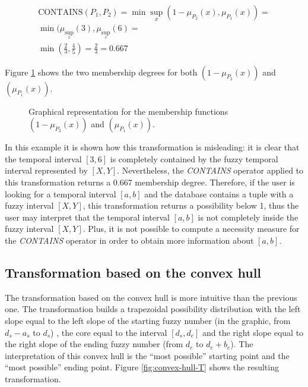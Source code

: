 \documentclass[twoside,twocolumn,a4paper]{article}
\begin{document}
\begin{eqnarray}
\nonumber
\mbox{CONTAINS}\left(P_1,P_2 \right) = \min \sup_{x} \left(1-\mu_{P_2}(x),\mu_{P_1}(x) \right) = \\
\nonumber
 \min (\mu_{\sup_x}(3),\mu_{\sup_x}(6) = \\
\nonumber
\min (\frac{2}{3},\frac{4}{5}) = \frac{2}{3} = 0.667
\end{eqnarray}

Figure \ref{fig:example_pi} shows the two membership degrees for both $\left(1-\mu_{P_2}(x)\right)$ and $\left( \mu_{P_1}(x) \right)$.

\begin{figure}[h!]
  \centering
  
  \caption{Graphical representation for the membership functions $\left(1-\mu_{P_2}(x)\right)$ and $\left( \mu_{P_1}(x) \right) $.}
  \label{fig:example_pi}
\end{figure}

In this example it is shown how this transformation is misleading: it is clear that the temporal interval $[3,6]$ is completely contained by the fuzzy temporal interval represented by $[X,Y]$. Nevertheless, the \emph{CONTAINS} operator applied to this transformation returns a 0.667 membership degree. Therefore, if the user is looking for a temporal interval $[a,b]$ and the database contains a tuple with a fuzzy interval $[X,Y]$, this transformation returns a possibility below 1, thus the user may interpret that the temporal interval $[a,b]$ is not completely inside the fuzzy interval $[X,Y]$. Plus, it is not possible to compute a necessity measure for the \emph{CONTAINS} operator in order to obtain more information about $[a,b]$.





\subsection{\label{subsubsec:trans-convex-hull}Transformation based on the convex hull}
The transformation based on the convex hull is more intuitive than the previous one. The transformation builds a trapezoidal possibility distribution with the left slope equal to the left slope of the starting fuzzy number (in the graphic, from $d_s-a_s$ to $d_s$) , the core equal to the interval $[d_s,d_e]$ and the right slope equal to the right slope of the ending fuzzy number (from $d_e$ to $d_e+b_e$). The interpretation of this convex hull is the ``most possible'' starting point and the ``most possible'' ending point. Figure \ref{fig:convex-hull-T} shows the resulting transformation.
\end{document}
